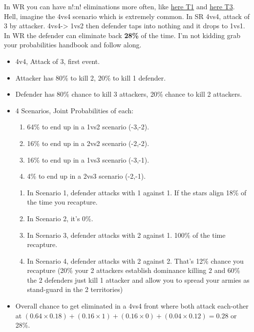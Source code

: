 In WR you can have n!:n! eliminations more often, like \href{https://www.warzone.com/MultiPlayer?GameID=41504555}{here T1} and \href{https://www.warzone.com/MultiPlayer?GameID=40648576}{here T3}. Hell, imagine the 4vs4 scenario which is extremely common. In SR 4vs4, attack of 3 by attacker. 4vs4-> 1vs2 then defender taps into nothing and it drops to 1vs1. In WR the defender can eliminate back \textbf{28\%} of the time. I'm not kidding grab your probabilities handbook and follow along.
\begin{itemize}
    \item 4v4, Attack of 3, first event. 
    \item Attacker has 80\% to kill 2, 20\% to kill 1 defender.
    \item Defender has 80\% chance to kill 3 attackers, 20\% chance to kill 2 attackers.
    \item 4 Scenarios, Joint Probabilities of each:
    \begin{enumerate}
        \item 64\% to end up in a 1vs2 scenario (-3,-2).
        \item 16\% to end up in a 2vs2 scenario (-2,-2).
        \item 16\% to end up in a 1vs3 scenario (-3,-1).
        \item 4\% to end up in a 2vs3 scenario (-2,-1).
    \end{enumerate}
    \begin{enumerate}
        \item In Scenario 1, defender attacks with 1 against 1. If the stars align 18\% of the time you recapture.
        \item In Scenario 2, it's 0\%.
        \item In Scenario 3, defender attacks with 2 against 1. 100\% of the time recapture.
        \item In Scenario 4, defender attacks with 2 against 2. That's 12\% chance you recapture (20\% your 2 attackers establish dominance killing 2 and 60\% the 2 defenders just kill 1 attacker and allow you to spread your armies as stand-guard in the 2 territories)
    \end{enumerate}
    \item Overall chance to get eliminated in a 4vs4 front where both attack each-other at $(0.64 \times 0.18) + (0.16 \times 1) + (0.16 \times 0) + (0.04 \times 0.12) = 0.28$ or 28\%.
\end{itemize}

